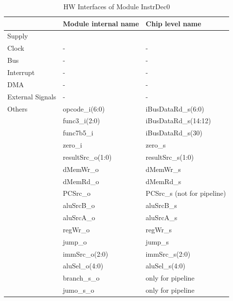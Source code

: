 \begin{table}[H]
\caption{HW Interfaces of Module InstrDec0}
\label{tab:asDecPer02}
\centering
\begin{tabularx}{\textwidth}{|l |l |X|}
  \hline
   & Module internal name & Chip level name \\
  \hline
  \hline
  Supply &  &  \\
  \hline
  Clock & - & - \\
  \hline
  Bus & - & - \\
  \hline
  Interrupt & - & - \\
  \hline
  DMA & - & - \\
  \hline
  External Signals & - & - \\
  \hline
  Others & opcode\_i(6:0) & iBusDataRd\_s(6:0) \\
         & func3\_i(2:0) & iBusDataRd\_s(14:12) \\
         & func7b5\_i & iBusDataRd\_s(30) \\
         & zero\_i & zero\_s \\
         & resultSrc\_o(1:0) & resultSrc\_s(1:0) \\
         & dMemWr\_o & dMemWr\_s \\
         & dMemRd\_o & dMemRd\_s \\
         & PCSrc\_o & PCSrc\_s (not for pipeline) \\
         & aluSrcB\_o & aluSrcB\_s \\
         & aluSrcA\_o & aluSrcA\_s \\
         & regWr\_o & regWr\_s \\
         & jump\_o & jump\_s \\
         & immSrc\_o(2:0) & immSrc\_s(2:0) \\
         & aluSel\_o(4:0) & aluSel\_s(4:0) \\
         & branch\_s\_o & only for pipeline \\
         & jumo\_s\_o & only for pipeline \\
  \hline
\end{tabularx}
\end{table}
